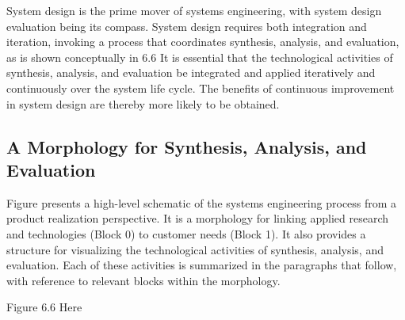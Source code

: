 System design is the prime mover of systems engineering, with system design evaluation being its compass. System design requires both integration and iteration, invoking a process that coordinates synthesis, analysis, and evaluation, as is shown conceptually in 6.6 It is essential that the technological activities of synthesis, analysis, and evaluation be integrated and applied iteratively and continuously over the system life cycle. The benefits of continuous improvement in system design are thereby more likely to be obtained.

\subsection{A Morphology for Synthesis, Analysis, and Evaluation}

Figure presents a high-level schematic of the systems engineering process from a product realization perspective. It is a morphology for linking applied research and technologies (Block 0) to customer needs (Block 1). It also provides a structure for visualizing the technological activities of synthesis, analysis, and evaluation. Each of these activities is summarized in the paragraphs that follow, with reference to relevant blocks within the morphology.

Figure 6.6 Here

